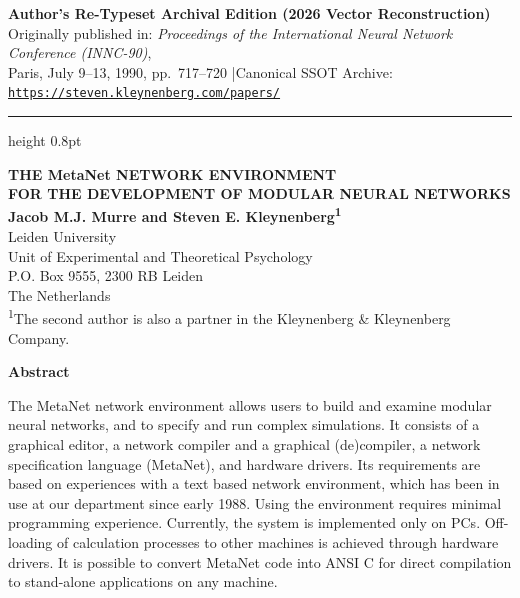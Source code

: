 \documentclass[11pt, a4paper]{article}
\begin{document}
\begin{center}
{\small\color{slatemuted}
\textbf{Author's Re-Typeset Archival Edition (2026 Vector Reconstruction)}\\[2pt]
Originally published in: \textit{Proceedings of the International Neural Network Conference (INNC-90)},\\
Paris, July 9--13, 1990, pp.~717--720 \quad|\quad Canonical SSOT Archive: \href{https://steven.kleynenberg.com/papers/}{\texttt{https://steven.kleynenberg.com/papers/}}
}
\end{center}

\vspace{2pt}
{\color{rulegray}\hrule height 0.8pt}
\vspace{10pt}

\begin{center}
{\LARGE\bfseries\color{navyaccent} THE MetaNet NETWORK ENVIRONMENT\\[3pt] FOR THE DEVELOPMENT OF MODULAR NEURAL NETWORKS}\\[10pt]
{\large\bfseries Jacob M.J. Murre and Steven E. Kleynenberg\textsuperscript{1}}\\[4pt]
{\normalsize Leiden University\\
Unit of Experimental and Theoretical Psychology\\
P.O. Box 9555, 2300 RB Leiden\\
The Netherlands}\\[4pt]
{\footnotesize\color{slatemuted} \textsuperscript{1}The second author is also a partner in the Kleynenberg \& Kleynenberg Company.}
\end{center}

\vspace{6pt}

\begin{center}
{\bfseries\color{navyaccent} Abstract}
\end{center}
\vspace{-4pt}
\noindent The MetaNet network environment allows users to build and examine modular neural networks, and to specify and run complex simulations. It consists of a graphical editor, a network compiler and a graphical (de)compiler, a network specification language (MetaNet), and hardware drivers. Its requirements are based on experiences with a text based network environment, which has been in use at our department since early 1988. Using the environment requires minimal programming experience. Currently, the system is implemented only on PCs. Off-loading of calculation processes to other machines is achieved through hardware drivers. It is possible to convert MetaNet code into ANSI C for direct compilation to stand-alone applications on any machine.
\end{document}
